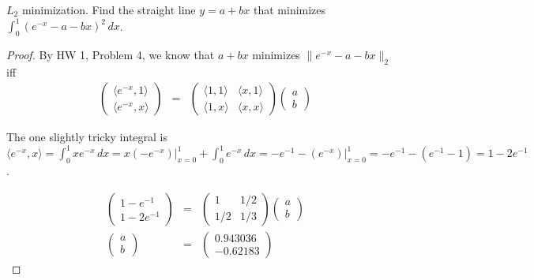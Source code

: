\documentclass{article}
\begin{document}
 $L_2$ minimization. Find the straight line $y = a + bx$ that minimizes $\int_0^1(e^{-x} - a - bx)^2 \, dx$.
\begin{proof}
By HW 1, Problem 4, we know that $a + bx$ minimizes $\|e^{-x} - a - bx\|_2$ iff 
\begin{align*}
\left( \begin{array}{c}
\langle e^{-x}, 1 \rangle \\
\langle e^{-x}, x \rangle  \end{array}\right)
& = &
\left( \begin{array}{cc}
\langle 1, 1 \rangle & \langle x , 1 \rangle \\
\langle 1, x \rangle & \langle x , x \rangle \end{array} \right) 
\left( \begin{array}{c}
a \\
b \end{array}\right) 
\end{align*}

The one slightly tricky integral is $\langle e^{-x} , x \rangle = \int_0^1 x e^{-x} \, dx = x (-e^{-x}) \rvert_{x=0}^1 + \int_0^1 e^{-x} \, dx =
-e^{-1} - (e^{-x}) \rvert_{x=0}^1 =  -e^{-1} - (e^{-1} - 1) = 1 - 2e^{-1}$.

\begin{align*}
\left( \begin{array}{c}
 1 - e^{-1}  \\
 1 - 2e^{-1}  \end{array}\right) & = & \left( \begin{array}{cc}
                                     1 &  1/2  \\
                                     1/2 & 1/3 \end{array} \right) 
                                                                  \left( \begin{array}{c}
                                                                      a \\
                                                                      b \end{array}\right) 
\\ \left( \begin{array}{c}
 a  \\
 b  \end{array}\right) & = & \left( \begin{array}{c}
                                0.943036 \\
                                -0.62183  \end{array}\right)       
\end{align*} 

\end{proof}
\end{document}
